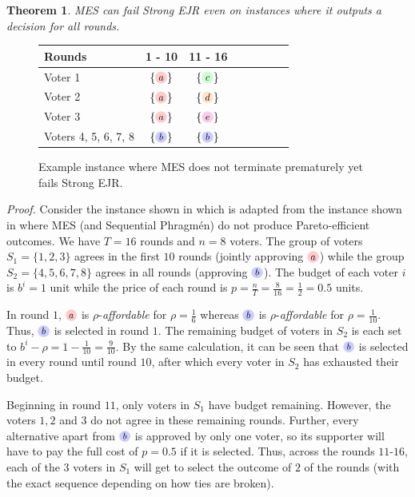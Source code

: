 \documentclass[10pt]{scrartcl}
\theoremstyle{plain}
\newtheorem{theorem}{Theorem}[section]
\theoremstyle{definition}
\newcommand{\alternativea}{\tikz[baseline=-3pt,transform shape,scale=0.85]{\node[text height=6pt,inner sep=1pt,fill=red!20,    circle,minimum width=12pt] (x) {$a$};}}
\newcommand{\alternativeb}{\tikz[baseline=-3pt,transform shape,scale=0.85]{\node[text height=6pt,inner sep=1pt,fill=blue!20,   circle,minimum width=12pt] (x) {$b$};}}
\newcommand{\alternativec}{\tikz[baseline=-3pt,transform shape,scale=0.85]{\node[text height=6pt,inner sep=1pt,fill=green!20,  circle,minimum width=12pt] (x) {$c$};}}
\newcommand{\alternatived}{\tikz[baseline=-3pt,transform shape,scale=0.85]{\node[text height=6pt,inner sep=1pt,fill=orange!20, circle,minimum width=12pt] (x) {$d$};}}
\newcommand{\alternativee}{\tikz[baseline=-3pt,transform shape,scale=0.85]{\node[text height=6pt,inner sep=1pt,fill=magenta!20,circle,minimum width=12pt] (x) {$e$};}}
\begin{document}
\begin{theorem}
    MES can fail Strong EJR even on instances where it outputs a decision for all rounds.
\end{theorem}


\begin{figure}
	\vspace{-12pt}	
	\centering
{\setlength{\tabcolsep}{4pt}
		\begin{tabular}{lccccccc}
			\toprule
			Rounds & 1 - 10 & 11 - 16 \\
			\midrule
			Voter 1 & $\{\alternativea\}$ &  $\{\alternativec\}$ \\
			Voter 2 & $\{\alternativea\}$ &  $\{\alternatived\}$ \\
			Voter 3 & $\{\alternativea\}$ &  $\{\alternativee\}$ \\
			Voters 4, 5, 6, 7, 8 & $\{\alternativeb\}$ &  $\{\alternativeb\}$ \\
			\bottomrule
	\end{tabular}}
	\caption{Example instance where MES does not terminate prematurely yet fails Strong EJR.}
    \label{fig:MES_fails_StrongEJR}
\end{figure}

\noindent
\emph{Proof.}\:
Consider the instance shown in  which is adapted from the instance shown in  where MES (and Sequential Phragm\'en) do not produce Pareto-efficient outcomes. We have $T = 16$ rounds and $n = 8$ voters. The group of voters $S_1 = \{1, 2, 3\}$ agrees in the first $10$ rounds (jointly approving $\alternativea$) while the group $S_2 = \{4, 5, 6, 7, 8\}$ agrees in all rounds (approving $\alternativeb$). The budget of each voter $i$ is $b^i = 1$ unit while the price of each round is $p = \frac{n}{T} = \frac{8}{16} = \frac12 = 0.5$ units. 

In round $1$, $\alternativea$ is $\rho$-\emph{affordable} for $\rho = \frac16$ whereas $\alternativeb$ is $\rho$-\emph{affordable} for $\rho = \frac{1}{10}$. Thus, $\alternativeb$ is selected in round $1$. The remaining budget of voters in $S_2$ is each set to $b^i - \rho = 1 - \frac{1}{10} = \frac{9}{10}$. By the same calculation, it can be seen that $\alternativeb$ is selected in every round until round $10$, after which every voter in $S_2$ has exhausted their budget. 

Beginning in round $11$, only voters in $S_1$ have budget remaining. However, the voters $1, 2$ and $3$ do not agree in these remaining rounds. Further, every alternative apart from $\alternativeb$ is approved by only one voter, so its supporter will have to pay the full cost of $p = 0.5$ if it is selected. Thus, across the rounds $11$-$16$, each of the $3$ voters in $S_1$ will get to select the outcome of $2$ of the rounds (with the exact sequence depending on how ties are broken). 
\end{document}
